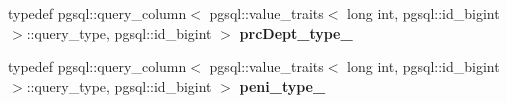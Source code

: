 \begin{DoxyCompactItemize}
\item 
typedef pgsql\+::query\+\_\+column$<$ pgsql\+::value\+\_\+traits$<$ long int, pgsql\+::id\+\_\+bigint $>$\+::query\+\_\+type, pgsql\+::id\+\_\+bigint $>$ {\bfseries prc\+Dept\+\_\+type\+\_\+}\hypertarget{structodb_1_1query__columns_3_01_1_1kpk_1_1data_1_1_loan_oper_00_01id__pgsql_00_01_a_01_4_1_1plan__class___aaa2c3ee082143aca868afe1ecafd20af}{}\label{structodb_1_1query__columns_3_01_1_1kpk_1_1data_1_1_loan_oper_00_01id__pgsql_00_01_a_01_4_1_1plan__class___aaa2c3ee082143aca868afe1ecafd20af}

\item 
typedef pgsql\+::query\+\_\+column$<$ pgsql\+::value\+\_\+traits$<$ long int, pgsql\+::id\+\_\+bigint $>$\+::query\+\_\+type, pgsql\+::id\+\_\+bigint $>$ {\bfseries peni\+\_\+type\+\_\+}\hypertarget{structodb_1_1query__columns_3_01_1_1kpk_1_1data_1_1_loan_oper_00_01id__pgsql_00_01_a_01_4_1_1plan__class___a2ce07e754ca719cba2bfa8d756de7532}{}\label{structodb_1_1query__columns_3_01_1_1kpk_1_1data_1_1_loan_oper_00_01id__pgsql_00_01_a_01_4_1_1plan__class___a2ce07e754ca719cba2bfa8d756de7532}

\end{DoxyCompactItemize}

